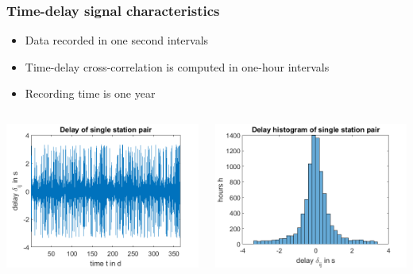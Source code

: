 \documentclass{beamer}
\begin{document}
\begin{frame}
\frametitle{Time-delay signal characteristics}
\begin{itemize}
\item Data recorded in one second intervals
\item Time-delay cross-correlation is computed in one-hour intervals
\item Recording time is one year
\end{itemize}

\begin{columns}
\includegraphics[width=\textwidth]{delayevolutionovertimeforonestation2_presentation.png}

\includegraphics[width=\textwidth]{delayevolutionovertimeforonestation_presentation.png}
\end{columns}
\end{frame}
\end{document}
